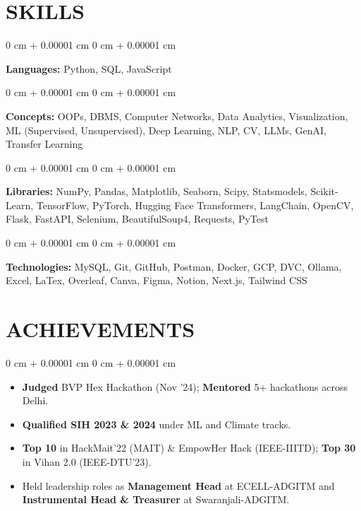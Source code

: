 \documentclass[10pt, letterpaper]{article}
\newenvironment{highlights}{
    \begin{itemize}[
        topsep=0.10 cm,
        parsep=0.10 cm,
        partopsep=0pt,
        itemsep=0pt,
        leftmargin=0 cm + 10pt
    ]
}{
    \end{itemize}
} %
\newenvironment{onecolentry}{
    \begin{adjustwidth}{
        0 cm + 0.00001 cm
    }{
        0 cm + 0.00001 cm
    }
}{
    \end{adjustwidth}
} %
\begin{document}
    
    \section{SKILLS}

        \begin{onecolentry}
            \textbf{Languages:} Python, SQL, JavaScript
        \end{onecolentry}

        \vspace{0.1 cm}

        \begin{onecolentry}
            \textbf{Concepts:} OOPs, DBMS, Computer Networks, Data Analytics, Visualization, ML (Supervised, Unsupervised), Deep Learning, NLP, CV, LLMs, GenAI, Transfer Learning
        \end{onecolentry}

        \vspace{0.1 cm}

        \begin{onecolentry}
            \textbf{Libraries:} NumPy, Pandas, Matplotlib, Seaborn, Scipy, Statsmodels, Scikit-Learn, TensorFlow, PyTorch, Hugging Face Transformers, LangChain, OpenCV, Flask, FastAPI, Selenium, BeautifulSoup4, Requests, PyTest
        \end{onecolentry}

        \vspace{0.1 cm}

        \begin{onecolentry}
            \textbf{Technologies:} MySQL, Git, GitHub, Postman, Docker, GCP, DVC, Ollama, Excel, LaTex, Overleaf, Canva, Figma, Notion, Next.js, Tailwind CSS
        \end{onecolentry}



    \section{ACHIEVEMENTS}

        \begin{onecolentry}
            \begin{highlights}
                \item \textbf{Judged} BVP Hex Hackathon (Nov '24); \textbf{Mentored} 5+ hackathons across Delhi.
                \item \textbf{Qualified SIH 2023 \& 2024} under ML and Climate tracks.
                \item \textbf{Top 10} in HackMait’22 (MAIT) \& EmpowHer Hack (IEEE-IIITD); \textbf{Top 30} in Vihan 2.0 (IEEE-DTU’23).
                \item Held leadership roles as \textbf{Management Head} at ECELL-ADGITM and \textbf{Instrumental Head \& Treasurer} at Swaranjali-ADGITM.
            \end{highlights}
        \end{onecolentry}
\end{document}
